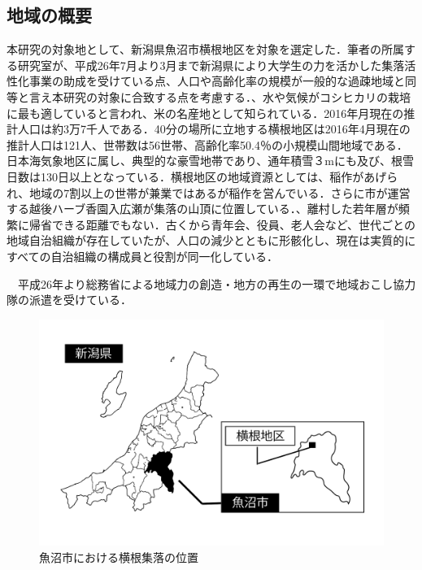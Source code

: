 \documentclass[a4paper]{jsarticle}
\begin{document}
\subsection{地域の概要}
本研究の対象地として、新潟県魚沼市横根地区を対象を選定した．筆者の所属する研究室が、平成26年7月より3月まで新潟県により大学生の力を活かした集落活性化事業の助成を受けている点、人口や高齢化率の規模が一般的な過疎地域と同等と言え本研究の対象に合致する点を考慮する．、水や気候がコシヒカリの栽培に最も適していると言われ、米の名産地として知られている．2016年月現在の推計人口は約3万7千人である．40分の場所に立地する横根地区は2016年4月現在の推計人口は121人、世帯数は56世帯、高齢化率50.4％の小規模山間地域である．日本海気象地区に属し、典型的な豪雪地帯であり、通年積雪３mにも及び、根雪日数は130日以上となっている．横根地区の地域資源としては、稲作があげられ、地域の7割以上の世帯が兼業ではあるが稲作を営んでいる．さらに市が運営する越後ハーブ香園入広瀬が集落の山頂に位置している．、離村した若年層が頻繁に帰省できる距離でもない．古くから青年会、役員、老人会など、世代ごとの地域自治組織が存在していたが、人口の減少とともに形骸化し、現在は実質的にすべての自治組織の構成員と役割が同一化している．\par
　平成26年より総務省による地域力の創造・地方の再生の一環で地域おこし協力隊の派遣を受けている．


\begin{figure}[H]
  \begin{center}
    \includegraphics[width=0.95\hsize]{./images/yokone_place.pdf}
    \caption{魚沼市における横根集落の位置}
    \label{fig:tmu_hino}
  \end{center}
\end{figure}
\end{document}
